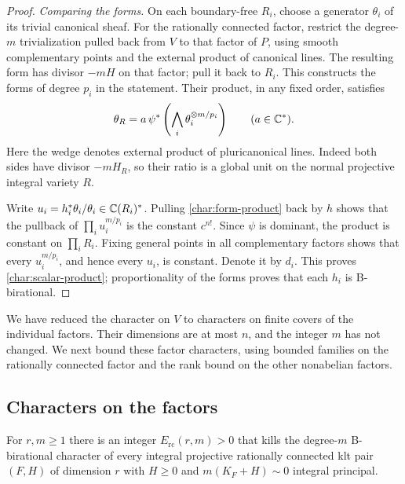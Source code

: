 \begin{proof}
\emph{Comparing the forms.}
On each boundary-free $R_i$, choose a generator $\theta_i$ of its
trivial canonical sheaf.  For the rationally connected factor,
restrict the degree-$m$ trivialization pulled back from $V$ to that
factor of $P$, using smooth complementary points and the external
product of canonical lines.  The resulting form has divisor $-mH$
on that factor; pull it back to $R_i$.  This constructs the forms
of degree $p_i$ in the statement.  Their product, in any fixed
order, satisfies
\begin{equation}\label{char:form-product}
 \theta_R=a\,\psi^*\left(\bigwedge_i\theta_i^{\otimes m/p_i}\right)
 \qquad(a\in\mathbb C^*).
\end{equation}
Here the wedge denotes external product of pluricanonical lines.
Indeed both sides have divisor $-mH_R$, so their ratio is a global
unit on the normal projective integral variety $R$.

Write $u_i=h_i^*\theta_i/\theta_i\in\mathbb C(R_i)^*$.  Pulling
\eqref{char:form-product} back by $h$ shows that the pullback of
$\prod_i u_i^{m/p_i}$ is the constant $c^{n!}$.  Since $\psi$ is
dominant, the product is constant on $\prod_iR_i$.  Fixing general
points in all complementary factors shows that every
$u_i^{m/p_i}$, and hence every $u_i$, is constant.  Denote it by
$d_i$.  This proves \eqref{char:scalar-product}; proportionality of
the forms proves that each $h_i$ is B-birational.
\end{proof}

We have reduced the character on $V$ to characters on finite covers
of the individual factors.  Their dimensions are at most $n$, and the
integer $m$ has not changed.  We next bound these factor characters, using
bounded families on the rationally connected factor and the rank
bound on the other nonabelian factors.

\subsection{Characters on the factors}

\begin{lemma}\label{char:rc-bound}
For $r,m\geq1$ there is an integer $E_{\mathrm{rc}}(r,m)>0$ that
kills the degree-$m$ B-birational character of every integral
projective rationally connected klt pair $(F,H)$ of dimension $r$
with $H\geq0$ and $m(K_F+H)\sim0$ integral principal.
\end{lemma}

